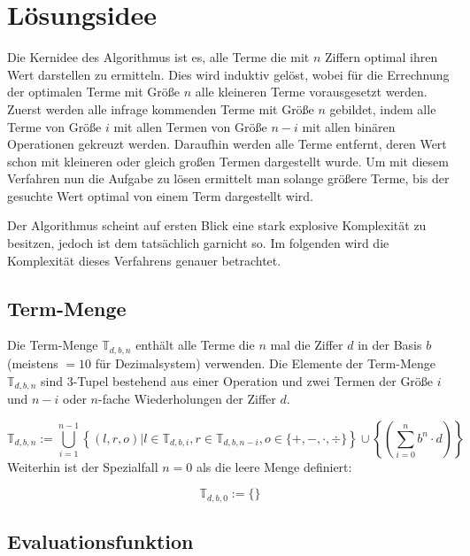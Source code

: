 \documentclass{article}
\theoremstyle{nonumberplain}
\begin{document}
    
\section{Lösungsidee}

Die Kernidee des Algorithmus ist es, alle Terme die mit \(n\) Ziffern optimal ihren Wert darstellen zu ermitteln.
Dies wird induktiv gelöst, wobei für die Errechnung der optimalen Terme mit Größe \(n\) alle kleineren Terme vorausgesetzt werden.
Zuerst werden alle infrage kommenden Terme mit Größe \(n\) gebildet, indem alle Terme von Größe \(i\) mit allen Termen von Größe \(n-i\) mit allen binären Operationen gekreuzt werden.
Daraufhin werden alle Terme entfernt, deren Wert schon mit kleineren oder gleich großen Termen dargestellt wurde.
Um mit diesem Verfahren nun die Aufgabe zu lösen ermittelt man solange größere Terme, bis der gesuchte Wert optimal von einem Term dargestellt wird.

Der Algorithmus scheint auf ersten Blick eine stark explosive Komplexität zu besitzen, jedoch ist dem tatsächlich garnicht so.
Im folgenden wird die Komplexität dieses Verfahrens genauer betrachtet.

\newcommand{\termsetn}[1]{\mathbb{T}_{d,b,{#1}}}
\newcommand{\termset}{\termsetn{n}}

\newcommand{\fad}{\forall d, b:\ }
\newcommand{\measure}[1]{\varphi_{d,b}\left(#1\right)}

\subsection{Term-Menge}

Die Term-Menge \(\termset\) enthält alle Terme die \(n\) mal die Ziffer \(d\) in der Basis \(b\) (meistens \(= 10\) für Dezimalsystem) verwenden.
Die Elemente der Term-Menge \(\termset\) sind 3-Tupel bestehend aus einer Operation und zwei Termen der Größe \(i\) und \(n-i\) oder \(n\)-fache Wiederholungen der Ziffer \(d\).

\[\termset :=
\bigcup_{i=1}^{n-1} \left\{ (l, r, o) | l \in \termsetn{i}, r \in \termsetn{n-i}, o \in \{ +, -, \cdot, \div \} \right\}
\cup \left\{ \left(\sum_{i=0}^n b^n \cdot d \right) \right\} \]
Weiterhin ist der Spezialfall \(n=0\) als die leere Menge definiert:

\[\termsetn{0} := \{\}\]

\subsection{Evaluationsfunktion}
\end{document}
